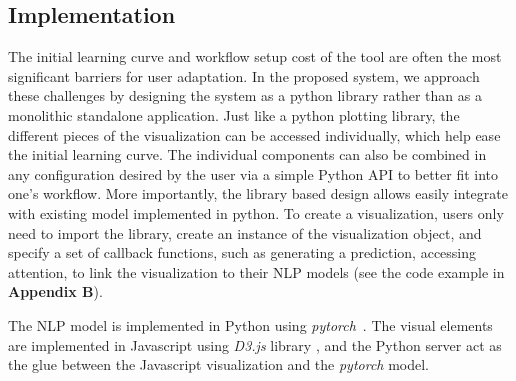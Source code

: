 \subsection{Implementation}
\label{sec:implementation}
The initial learning curve and workflow setup cost of the tool are often the most significant barriers for user adaptation.
In the proposed system, we approach these challenges by designing the system as a python library rather than as a monolithic standalone application. 
Just like a python plotting library, the different pieces of the visualization can be accessed individually, which help ease the initial learning curve. 
The individual components can also be combined in any configuration desired by the user via a simple Python API to better fit into one's workflow.
More importantly, the library based design allows easily integrate with existing model implemented in python.
%
To create a visualization, users only need to import the library, create an instance of the visualization object, and specify a set of callback functions, such as generating a prediction, accessing attention, to link the visualization to their NLP models (see the code example in \textbf{Appendix B}). 


%
The NLP model is implemented in Python using \emph{pytorch}~\cite{PaszkeGrossChintala2017}.
The visual elements are implemented in Javascript using \emph{D3.js} library , and the Python server act as the glue between the Javascript visualization and the \emph{pytorch} model.
